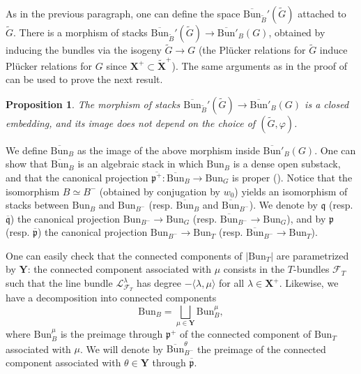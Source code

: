 \documentclass[11pt]{amsart}
\theoremstyle{plain}
\newtheorem{prop}[thm]{Proposition}
\theoremstyle{remark}
\numberwithin{equation}{section}
\begin{document}
	As in the previous paragraph, one can define the space $\overline{\mathrm{Bun}}_{\tilde{B}}'(\tilde{G})$ attached to $\tilde{G}$. There is a morphism of stacks  $\overline{\mathrm{Bun}}_{\tilde{B}}'(\tilde{G})\to\overline{\mathrm{Bun}}'_B(G)$, obtained by inducing the bundles via the isogeny $\tilde{G}\to G$ (the Pl\"ucker relations for $\tilde{G}$ induce Pl\"ucker relations for $G$ since $\mathbf{X}^+\subset\widetilde{\mathbf{X}}^+$). The same arguments as in the proof of \cite[Lemma 4.1.2]{ABBGM} can be used to prove the next result.
	\begin{prop}\label{prop closed immersion}
		The morphism  of stacks $\overline{\mathrm{Bun}}_{\tilde{B}}'(\tilde{G})\to\overline{\mathrm{Bun}}'_B(G)$ is a closed embedding, and its image does not depend on the choice of $(\tilde{G},\varphi)$.
	\end{prop}
	
	We define $\overline{\mathrm{Bun}}_B$ as the image of the above morphism inside $\overline{\mathrm{Bun}}'_B(G)$. One can show that $\overline{\mathrm{Bun}}_B$ is an algebraic stack in which $\mathrm{Bun}_B$ is a dense open substack, and that the canonical projection $\overline{\mathfrak{p}^+}:\overline{\mathrm{Bun}}_B\to \mathrm{Bun}_G$ is proper (\cite[Proposition 1.2.2]{BG}). Notice that the isomorphism $B\simeq B^-$ (obtained by conjugation by $w_0$) yields an isomorphism of stacks between $\mathrm{Bun}_B$ and $\mathrm{Bun}_{B^-}$ (resp. $\overline{\mathrm{Bun}}_B$ and $\overline{\mathrm{Bun}}_{B^-}$). We denote by $\mathfrak{q}$ (resp. $\overline{\mathfrak{q}}$) the canonical projection $\mathrm{Bun}_{B^-}\to \mathrm{Bun}_{G}$ (resp. $\overline{\mathrm{Bun}}_{B^-}\to \mathrm{Bun}_{G}$), and by $\mathfrak{p}$  (resp. $\overline{\mathfrak{p}}$) the canonical projection $\mathrm{Bun}_{B^-}\to \mathrm{Bun}_{T}$ (resp. $\overline{\mathrm{Bun}}_{B^-}\to \mathrm{Bun}_{T}$).
	
	One can easily check that the connected components of $|\mathrm{Bun}_T|$ are parametrized by $\mathbf{Y}$: the connected component associated with $\mu$ consists in the $T$-bundles $\mathcal{F}_T$ such that the line bundle $\mathcal{L}_{\mathcal{F}_T}^\lambda$ has degree $-\langle\lambda,\mu\rangle$ for all $\lambda\in\mathbf{X}^+$. Likewise, we have a decomposition into connected components
 $$\mathrm{Bun}_B=\bigsqcup_{\mu\in\mathbf{Y}}\mathrm{Bun}_B^\mu, $$
 where $\mathrm{Bun}_B^\mu$ is the preimage through $\mathfrak{p}^+$ of the connected component of $\mathrm{Bun}_T$ associated with $\mu$. We will denote by $\overline{\mathrm{Bun}}_{B^-}^\theta$ the preimage of the connected component associated with $\theta\in \mathbf{Y}$ through $\overline{\mathfrak{p}}$.
	
\end{document}
